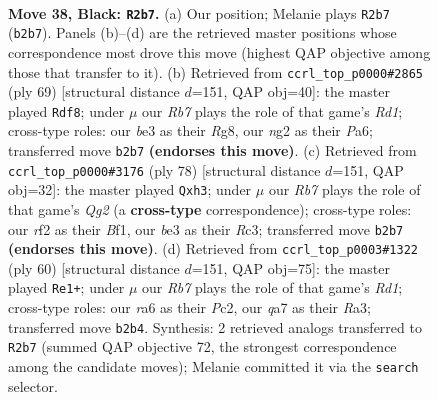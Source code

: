 \documentclass[11pt]{article}
\begin{document}
\clearpage

\begin{figure}[p]\centering
\begin{subfigure}{0.46\textwidth}\centering
\resizebox{\linewidth}{!}{%
\newchessgame
\chessboard[
  setfen={nr4k1/Q4pb1/R7/4p3/4P3/4Bn2/1r1NKRN1/7q b - - 1 38},
  showmover=false,
  pgfstyle=straightmove, color=movearrow, markmove={b2-b7}
]}
\caption{}
\end{subfigure}\hfill
\begin{subfigure}{0.46\textwidth}\centering
\resizebox{\linewidth}{!}{%
\newchessgame
\chessboard[
  setfen={3r2rk/7p/p7/1pq3n1/3N2R1/8/1PP5/1K1R1Q2 b - - 5 35},
  showmover=false,
  pgfstyle=straightmove, color=movearrow, markmove={d8-f8}
]}
\caption{}
\end{subfigure}
\\[4pt]
\begin{subfigure}{0.46\textwidth}\centering
\resizebox{\linewidth}{!}{%
\newchessgame
\chessboard[
  setfen={5rk1/7r/1p6/p1nPp3/2P1P1b1/2R2N1q/6Q1/1R3BK1 w - - 0 40},
  showmover=false,
  pgfstyle=straightmove, color=movearrow, markmove={g2-h3}
]}
\caption{}
\end{subfigure}\hfill
\begin{subfigure}{0.46\textwidth}\centering
\resizebox{\linewidth}{!}{%
\newchessgame
\chessboard[
  setfen={1r6/3r3p/4kn2/1b1N4/p6P/R4B2/2P5/2KR4 w - - 1 31},
  showmover=false,
  pgfstyle=straightmove, color=movearrow, markmove={d1-e1}
]}
\caption{}
\end{subfigure}
\caption{\textbf{Move 38, Black: \texttt{R2b7}.} (a) Our position; Melanie plays \texttt{R2b7} (\texttt{b2b7}). Panels (b)--(d) are the retrieved master positions whose correspondence most drove this move (highest QAP objective among those that transfer to it). (b) Retrieved from \texttt{ccrl\_top\_p0000\#2865} (ply 69) [structural distance $d$=151, QAP obj=40]: the master played \texttt{Rdf8}; under $\mu$ our \emph{Rb7} plays the role of that game's \emph{Rd1}; cross-type roles: our \emph{b}e3 as their \emph{R}g8, our \emph{n}g2 as their \emph{P}a6; transferred move \texttt{b2b7} \textbf{(endorses this move)}. (c) Retrieved from \texttt{ccrl\_top\_p0000\#3176} (ply 78) [structural distance $d$=151, QAP obj=32]: the master played \texttt{Qxh3}; under $\mu$ our \emph{Rb7} plays the role of that game's \emph{Qg2} (a \textbf{cross-type} correspondence); cross-type roles: our \emph{r}f2 as their \emph{B}f1, our \emph{b}e3 as their \emph{R}c3; transferred move \texttt{b2b7} \textbf{(endorses this move)}. (d) Retrieved from \texttt{ccrl\_top\_p0003\#1322} (ply 60) [structural distance $d$=151, QAP obj=75]: the master played \texttt{Re1+}; under $\mu$ our \emph{Rb7} plays the role of that game's \emph{Rd1}; cross-type roles: our \emph{r}a6 as their \emph{P}c2, our \emph{q}a7 as their \emph{R}a3; transferred move \texttt{b2b4}. Synthesis: 2 retrieved analogs transferred to \texttt{R2b7} (summed QAP objective 72, the strongest correspondence among the candidate moves); Melanie committed it via the \texttt{search} selector.}
\label{fig:thought-m75}
\end{figure}
\end{document}
